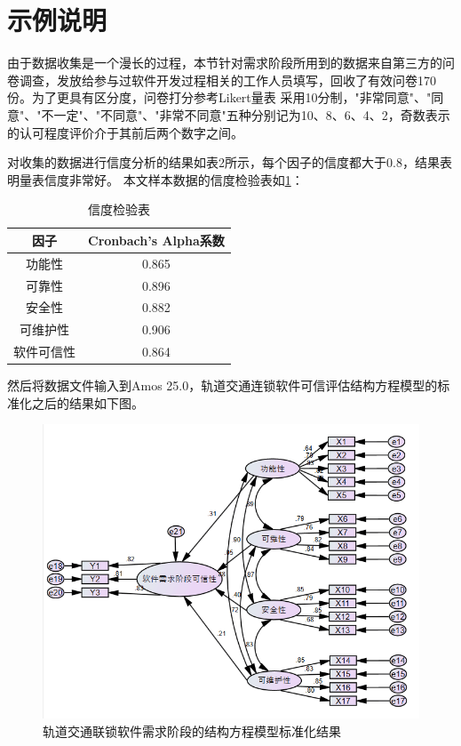 \section{示例说明}
由于数据收集是一个漫长的过程，本节针对需求阶段所用到的数据来自第三方的问卷调查，发放给参与过软件开发过程相关的工作人员填写，回收了有效问卷170份。为了更具有区分度，问卷打分参考Likert量表 采用10分制，"非常同意"、"同意"、"不一定"、"不同意"、"非常不同意"五种分别记为10、8、6、4、2，奇数表示的认可程度评价介于其前后两个数字之间。

对收集的数据进行信度分析的结果如表2所示，每个因子的信度都大于0.8，结果表明量表信度非常好。
本文样本数据的信度检验表如\ref{tab-3-3}：
\begin{table}[!ht]
	\centering
	\renewcommand\arraystretch{1.3}
	\caption{信度检验表}
	\begin{tabular}{|c|c|}
		\hline
		\textbf{因子} & \textbf{Cronbach’s Alpha系数} \\
		\hline
		功能性 & 0.865  \\
		\hline
		可靠性 & 0.896\\
		\hline
		安全性 &  0.882 \\
		\hline
		可维护性  & 0.906 \\
		\hline
		软件可信性 & 0.864 \\
		\hline
	\end{tabular}
	\label{tab-3-3}
\end{table}

然后将数据文件输入到Amos 25.0，轨道交通连锁软件可信评估结构方程模型的标准化之后的结果如下图。
\begin{figure}[htb]
	\centering
	\includegraphics[width=13cm]{fig/3_3.png}
	\caption{轨道交通联锁软件需求阶段的结构方程模型标准化结果}
	\label{fig:3_03}
\end{figure}

